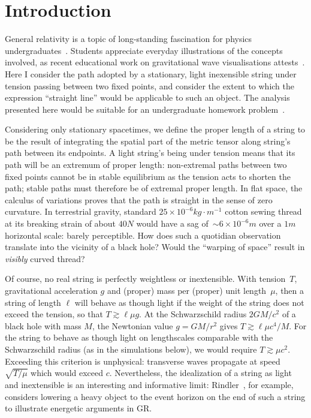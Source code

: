 \documentclass{ws-tpe}
\begin{document}
\section{Introduction}

General relativity is a topic of long-standing fascination for physics
undergraduates~\cite{christensen2012,taylor2000}.  Students appreciate
everyday illustrations of the concepts involved, as recent educational
work on gravitational wave visualisations attests~\cite{overduin2018}.
Here I consider the path adopted by a stationary,
light inexensible string under tension passing between two fixed points, and consider the extent to which the expression  ``straight line'' would be applicable to such an object.
The analysis presented here would be suitable for an undergraduate
homework problem~\cite{romano2019}.

Considering only stationary spacetimes, we define the proper length of
a string to be the result of integrating the spatial part of the
metric tensor along string's path between its endpoints.  A light
string's being under tension means that its path will be an extremum
of proper length: non-extremal paths between two fixed points cannot
be in stable equilibrium as the tension acts to shorten the path;
stable paths must therefore be of extremal proper length.  In flat
space, the calculus of variations proves that the path is straight in
the sense of zero curvature.  In terrestrial gravity, standard
$25\times 10^{-6}\unit{kg}\cdot\unit{m}^{-1}$ cotton sewing thread at
its breaking strain of about $40\unit{N}$ would have a sag of~${\sim}
6\times 10^{-6}\unit{m}$ over a $1\unit{m}$ horizontal scale: barely
perceptible.  How does such a quotidian observation translate into the
vicinity of a black hole?  Would the ``warping of space'' result in
{\em visibly} curved thread?

Of course, no real string is perfectly weightless or inextensible.
With tension~$T$, gravitational acceleration $g$ and (proper) mass per
(proper) unit length~$\mu$, then a string of length $\ell$ will behave
as though light if the weight of the string does not exceed the
tension, so that $T\gtrsim\ell\mu g$.  At the Schwarzschild radius
$2GM/c^2$ of a black hole with mass $M$, the Newtonian value
$g=GM/r^2$ gives $T\gtrsim\ell\mu c^4/M$.  For the string to behave as
though light on lengthscales comparable with the Schwarzschild radius
(as in the simulations below), we would require $T\gtrsim\mu c^2$.
Exceeding this criterion is unphysical:
transverse waves propagate at
speed~$\sqrt{T/\mu}$ which would exceed $c$.  Nevertheless, the idealization of a
string as light and inextensible is an interesting and informative
limit: Rindler~\cite{rindler}, for example, considers lowering a heavy
object to the event horizon on the end of such a string to illustrate
energetic arguments in GR.
\end{document}
